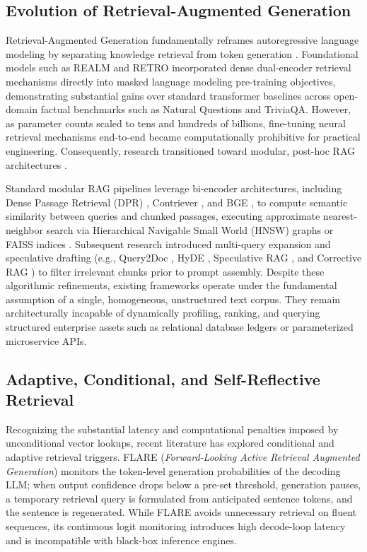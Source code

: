 \documentclass[fleqn,10pt]{article}
\begin{document}
\subsection{Evolution of Retrieval-Augmented Generation}
Retrieval-Augmented Generation fundamentally reframes autoregressive language modeling by separating knowledge retrieval from token generation \cite{lewis2020rag}. Foundational models such as REALM \cite{guu2020realm} and RETRO \cite{borgeaud2022retro} incorporated dense dual-encoder retrieval mechanisms directly into masked language modeling pre-training objectives, demonstrating substantial gains over standard transformer baselines across open-domain factual benchmarks such as Natural Questions and TriviaQA. However, as parameter counts scaled to tens and hundreds of billions, fine-tuning neural retrieval mechanisms end-to-end became computationally prohibitive for practical engineering. Consequently, research transitioned toward modular, post-hoc RAG architectures \cite{gao2023rag_survey}.

Standard modular RAG pipelines leverage bi-encoder architectures, including Dense Passage Retrieval (DPR) \cite{karpukhin2020dpr}, Contriever \cite{izacard2021contriever}, and BGE \cite{xiao2023bge}, to compute semantic similarity between queries and chunked passages, executing approximate nearest-neighbor search via Hierarchical Navigable Small World (HNSW) graphs or FAISS indices \cite{malkov2018hnsw,johnson2019billion}. Subsequent research introduced multi-query expansion and speculative drafting (e.g., Query2Doc \cite{wang2023query2doc}, HyDE \cite{gao2022hyde}, Speculative RAG \cite{wang2024speculative}, and Corrective RAG \cite{yan2024crag}) to filter irrelevant chunks prior to prompt assembly. Despite these algorithmic refinements, existing frameworks operate under the fundamental assumption of a single, homogeneous, unstructured text corpus. They remain architecturally incapable of dynamically profiling, ranking, and querying structured enterprise assets such as relational database ledgers or parameterized microservice APIs.

\subsection{Adaptive, Conditional, and Self-Reflective Retrieval}
Recognizing the substantial latency and computational penalties imposed by unconditional vector lookups, recent literature has explored conditional and adaptive retrieval triggers. FLARE (\textit{Forward-Looking Active Retrieval Augmented Generation}) \cite{jiang2023flare} monitors the token-level generation probabilities of the decoding LLM; when output confidence drops below a pre-set threshold, generation pauses, a temporary retrieval query is formulated from anticipated sentence tokens, and the sentence is regenerated. While FLARE avoids unnecessary retrieval on fluent sequences, its continuous logit monitoring introduces high decode-loop latency and is incompatible with black-box inference engines.
\end{document}
